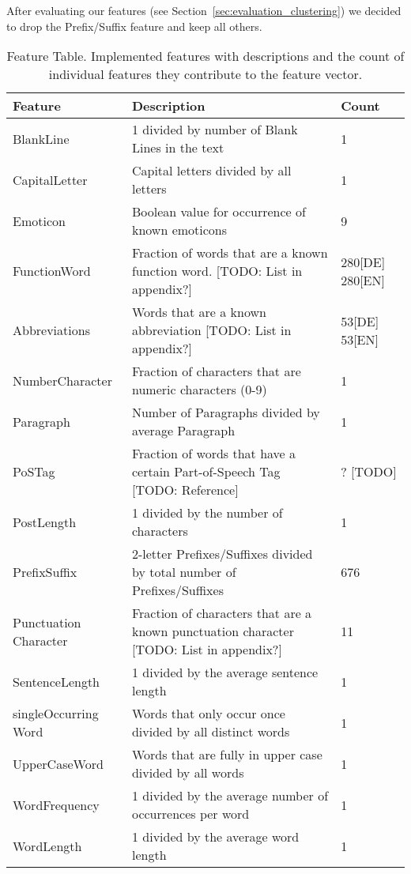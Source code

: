 After evaluating our features (see Section~\ref{sec:evaluation_clustering}) we decided to drop the Prefix/Suffix feature and keep all others.


\begin{table}[tbp]
    \begin{tabular}{|p{2.6cm}|p{8.2cm}|p{1.2cm}|}
    \hline
    Feature					& Description																	& Count				\\ \hline
    BlankLine				& 1 divided by number of Blank Lines in the text								& 1					\\ \hline
    CapitalLetter			& Capital letters divided by all letters										& 1					\\ \hline
    Emoticon				& Boolean value for occurrence of known emoticons								& 9					\\ \hline
    FunctionWord			& Fraction of words that are a known function word. [TODO: List in appendix?]	& 280[DE] 280[EN]	\\ \hline
    Abbreviations			& Words that are a known abbreviation [TODO: List in appendix?]					& 53[DE] 53[EN]		\\ \hline
    NumberCharacter			& Fraction of characters that are numeric characters (0-9)						& 1					\\ \hline
    Paragraph				& Number of Paragraphs divided by average Paragraph								& 1					\\ \hline
    PoSTag					& Fraction of words that have a certain Part-of-Speech Tag [TODO: Reference]	& ? [TODO]			\\ \hline
    PostLength				& 1 divided by the number of characters											& 1					\\ \hline
    PrefixSuffix			& 2-letter Prefixes/Suffixes divided by total number of Prefixes/Suffixes		& 676 			 	\\ \hline
    Punctuation Character	& Fraction of characters that are a known punctuation character [TODO: List in appendix?]	& 11				\\ \hline
    SentenceLength			& 1 divided by the average sentence length										& 1 				\\ \hline
    singleOccurring Word	& Words that only occur once divided by all distinct words						& 1					\\ \hline
    UpperCaseWord			& Words that are fully in upper case divided by all words						& 1					\\ \hline
    WordFrequency			& 1 divided by the average number of occurrences per word						& 1					\\ \hline
    WordLength				& 1 divided by the average word length											& 1					\\ \hline
    \end{tabular}
	\caption{Feature Table. Implemented features with descriptions and the count of individual features they contribute to the feature vector.}
	\label{tab:featureTable}
\end{table}
